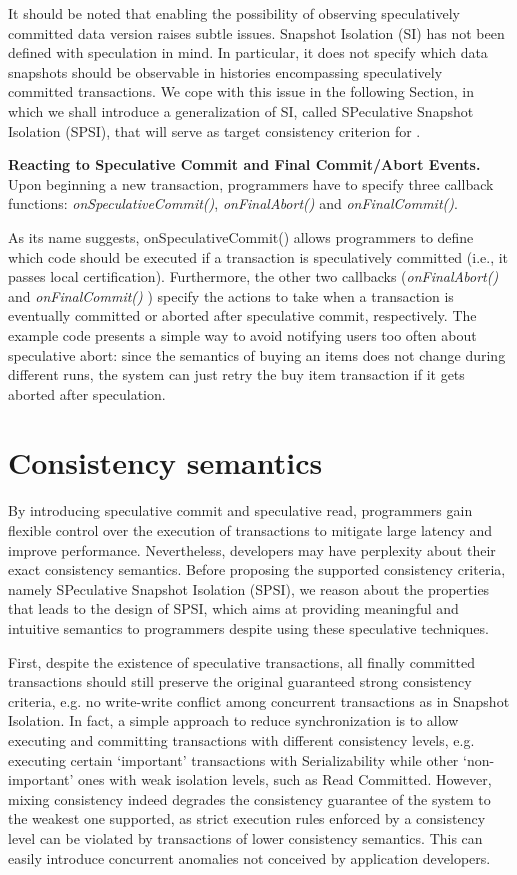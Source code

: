 It should be noted that enabling the possibility of observing speculatively committed data version raises subtle issues.  Snapshot Isolation (SI) has not been defined with speculation in mind. In particular, it does not specify which data snapshots should be observable in histories encompassing speculatively committed transactions. We cope with this issue in the following Section, in which we shall introduce a generalization of SI, called SPeculative Snapshot Isolation (SPSI), that will serve as target consistency criterion for \specula.


{\bf Reacting to Speculative Commit and Final Commit/Abort Events.} Upon beginning a new transaction, programmers have to specify three callback functions: \textit{onSpeculativeCommit()}, \textit{onFinalAbort()} and \textit{onFinalCommit()}.

As its name suggests, onSpeculativeCommit() allows programmers to define which code should be executed if a transaction is speculatively committed (i.e., it passes local certification). Furthermore, the other two callbacks (\textit{onFinalAbort()} and \textit{onFinalCommit()} ) specify the actions to take when a transaction is eventually committed or aborted after speculative commit, respectively. The example code presents a simple way to avoid notifying users too often about speculative abort: since the semantics of buying an items does not change during different runs, the system can just retry the buy item transaction if it gets aborted after speculation.

\section{Consistency semantics}
By introducing speculative commit and speculative read, programmers gain flexible control over the execution of transactions to mitigate large latency and improve performance. Nevertheless, developers may have perplexity about their exact consistency semantics. Before proposing the supported consistency criteria, namely SPeculative Snapshot Isolation (SPSI), we reason about the properties that leads to the design of SPSI, which aims at providing meaningful and intuitive semantics to programmers despite using these speculative techniques.

First, despite the existence of speculative transactions, all finally committed transactions should still preserve the original guaranteed strong consistency criteria, e.g. no write-write conflict among concurrent transactions as in Snapshot Isolation. In fact, a simple approach to reduce synchronization is to allow executing and committing transactions with different consistency levels, e.g. executing certain `important' transactions with Serializability while other `non-important' ones with weak isolation levels, such as Read Committed. However, mixing consistency indeed degrades the consistency guarantee of the system to the weakest one supported, as strict execution rules enforced by a consistency level can be violated by transactions of lower consistency semantics. This can easily introduce concurrent anomalies not conceived by application developers.

